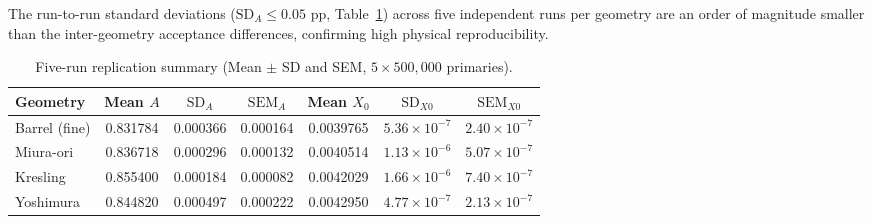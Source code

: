 \documentclass[a4paper,11pt]{article}
\begin{document}
\begin{table}[!htbp]
\centering
\caption{Pairwise acceptance comparisons across 5-run replications, reporting mean acceptance difference ($\Delta A$), 95\% confidence intervals, standardized effect size (Cohen's $h$), and Holm--Bonferroni corrected significance.}
\label{tab:pairwise_tests}
\smallskip
{}
\end{table}

The run-to-run standard deviations ($\text{SD}_A \le 0.05$ pp, Table~\ref{tab:multirun_results}) across five independent runs per geometry are an order of magnitude smaller than the inter-geometry acceptance differences, confirming high physical reproducibility.

\begin{table}[!htbp]
\centering
\caption{Five-run replication summary (Mean $\pm$ SD and SEM, $5 \times 500{,}000$ primaries).}
\label{tab:multirun_results}
\smallskip
\begin{tabular}{lcccccc}
\toprule
Geometry & Mean $A$ & $\text{SD}_A$ & $\text{SEM}_A$ & Mean $X_0$ & $\text{SD}_{X0}$ & $\text{SEM}_{X0}$ \\
\midrule
Barrel (fine) & 0.831784 & 0.000366 & 0.000164 & 0.0039765 & $5.36\times 10^{-7}$ & $2.40\times 10^{-7}$ \\
Miura-ori     & 0.836718 & 0.000296 & 0.000132 & 0.0040514 & $1.13\times 10^{-6}$ & $5.07\times 10^{-7}$ \\
Kresling      & 0.855400 & 0.000184 & 0.000082 & 0.0042029 & $1.66\times 10^{-6}$ & $7.40\times 10^{-7}$ \\
Yoshimura     & 0.844820 & 0.000497 & 0.000222 & 0.0042950 & $4.77\times 10^{-7}$ & $2.13\times 10^{-7}$ \\
\bottomrule
\end{tabular}
\end{table}
\end{document}
